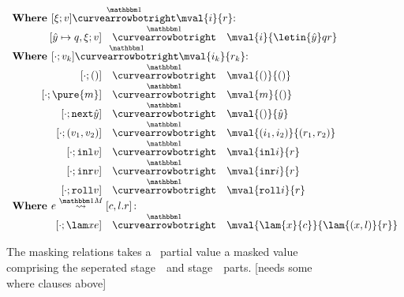 \begin{figure}
\begin{abstrsyn}
\[\begin{array}{rrrl}

\multicolumn{4}{l}  {\text{\bf Where } [\xi;v] \vsplito \mval {i} {r} \text{:}}          \\
\hspace{0.25in} 
&[\hat y \mapsto q,\xi;v]  &\vsplito& \mval  {i}             {\letin {\hat y} q {r}}      \\

\multicolumn{4}{l}  {\text{\bf Where } [\cdot;v_k] \vsplito \mval {i_k} {r_k} \text{:}}  \\
&[\cdot;()]                &\vsplito& \mval  {()}            {()}                         \\
&[\cdot;\pure{m}]          &\vsplito& \mval  {m}             {()}                         \\
&[\cdot;\next{\hat y}]     &\vsplito& \mval  {()}            {\hat y}                     \\
&[\cdot;(v_1,v_2)]         &\vsplito& \mval  {(i_1,i_2)}     {(r_1,r_2)}                  \\
&[\cdot;\inl{v}]           &\vsplito& \mval  {\inl{i}}       {r}                          \\
&[\cdot;\inr{v}]           &\vsplito& \mval  {\inr{i}}       {r}                          \\
&[\cdot;\roll{v}]          &\vsplito& \mval  {\roll{i}}      {r}                          \\

\multicolumn{4}{l}  {\text{\bf Where } \splitone e A {c,l.r} \text{:}}                   \\
&[\cdot;\lam xe]           &\vsplito& \mval  {\lam {x} {c}}  {\lam {(x,l)} {r}}
\end{array}\]
\end{abstrsyn}
\caption{The masking relations takes a \lang\ partial value a masked value
comprising the seperated stage~\bbone\ and stage~\bbtwo\ parts. 
[needs some where clauses above]}
\label{fig:valMask}
\end{figure}

